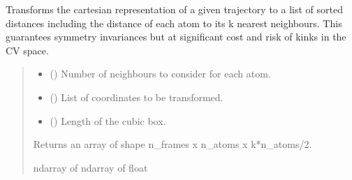 \documentclass[a4paper,10pt,english]{report}
\begin{document}
\begin{fulllineitems}
\label{\detokenize{NNucleate:NNucleate.data_augmentation.transform_traj_to_knn_list}}
\pysigstartsignatures
{}
\pysigstopsignatures
\sphinxAtStartPar
Transforms the cartesian representation of a given trajectory to a list of sorted distances including the distance of each atom to its k nearest neighbours. This guarantees symmetry invariances but at significant cost and risk of kinks in the CV space.
\begin{quote}\begin{description}
\begin{itemize}
\item {} 
\sphinxAtStartPar
{} () \textendash{} Number of neighbours to consider for each atom.

\item {} 
\sphinxAtStartPar
{} () \textendash{} List of coordinates to be transformed.

\item {} 
\sphinxAtStartPar
{} () \textendash{} Length of the cubic box.

\end{itemize}

\sphinxAtStartPar
Returns an array of shape n\_frames x n\_atoms x k*n\_atoms/2.

\sphinxAtStartPar
ndarray of ndarray of float

\end{description}\end{quote}

\end{fulllineitems}

\end{document}
